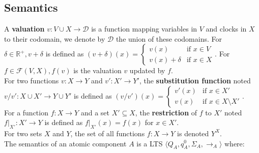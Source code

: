 \documentclass[a4paper]{article}
\begin{document}
\subsection*{Semantics}
A \textbf{valuation} $v: V \cup X \to \mathcal{D}$ is a function mapping variables in $V$ and clocks in $X$ to their
codomain, we denote by $\mathcal{D}$ the union of these codomains.
For $\delta \in \mathbb{R}^+, v+\delta$ is defined as $(v+\delta) (x) =
  \begin{cases}
    v(x)          & \text{if $x \in V$} \\
    v(x) + \delta & \text{if $x \in X$}
  \end{cases}.$
For $f \in \mathcal{F}(V, X), f(v)$ is the valuation $v$ updated by $f$. \\
For two functions $v: X \to Y$ and $v': X' \to Y'$, the \textbf{substitution function} noted
$v/v': X \cup X' \to Y \cup Y'$ is defined as $(v/v') (x) =
  \begin{cases}
    v'(x) & \text{if } x \in X'             \\
    v(x)  & \text{if } x \in X \setminus X'
  \end{cases}$. \\
For a function $f: X \to Y$ and a set $X' \subseteq X$, the \textbf{restriction} of $f$ to $X'$ noted
$f \vert_{X'}: X' \to Y$ is defined as $f \vert_{X'}(x) = f(x)$ for $x \in X'$.\\
For two sets $X$ and $Y$, the set of all functions $f: X \to Y$ is denoted $Y^X$. \\
The semantics of an atomic component $A$ is a LTS $\langle Q_A, q_A^0, \Sigma_A, \xrightarrow{}_A \rangle$ where:
\end{document}
